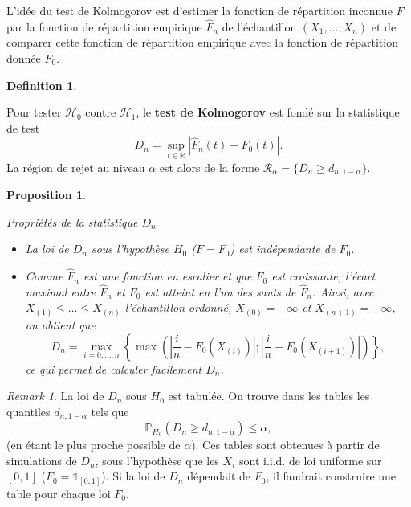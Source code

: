 \documentclass[
]{book}
\providecommand{\tightlist}{%
  \setlength{\itemsep}{0pt}\setlength{\parskip}{0pt}}
\newtheorem{proposition}{Proposition}[chapter]
\theoremstyle{definition}
\newtheorem{definition}{Definition}[chapter]
\theoremstyle{definition}
\theoremstyle{definition}
\theoremstyle{definition}
\theoremstyle{remark}
\newtheorem*{remark}{Remark}
\begin{document}
L'idée du test de Kolmogorov est d'estimer la fonction de répartition inconnue \(F\) par la fonction de répartition empirique \(\hat F_n\) de l'échantillon \((X_1,\ldots,X_n)\) et de comparer cette fonction de répartition empirique avec la fonction de répartition donnée \(F_0\).

\begin{definition}
\protect\hypertarget{def:unlabeled-div-18}{}\label{def:unlabeled-div-18}

Pour tester \(\mathcal{H}_0\) contre \(\mathcal{H}_1\), le \textbf{test de Kolmogorov} est fondé sur la statistique de test
\[D_n=\sup_{t \in \mathbb{R}} | \hat F_n(t)-F_0(t)|.\]
La région de rejet au niveau \(\alpha\) est alors de la forme \(\mathcal{R}_{\alpha}=\{D_n \geq d_{n,1-\alpha}\}\).

\end{definition}

\begin{proposition}
\protect\hypertarget{prp:unlabeled-div-19}{}\label{prp:unlabeled-div-19}

Propriétés de la statistique \(D_n\)

\begin{itemize}
\tightlist
\item
  La loi de \(D_n\) sous l'hypothèse \(H_0\) (\(F=F_0\)) est indépendante de \(F_0\).
\item
  Comme \(\hat F_n\) est une fonction en escalier et que \(F_0\) est croissante, l'écart maximal entre \(\hat F_n\) et \(F_0\) est atteint en l'un des sauts de \(\hat F_n\). Ainsi, avec
  \(X_{(1)}\leq \ldots \leq X_{(n)}\) l'échantillon ordonné, \(X_{(0)}=-\infty\) et \(X_{(n+1)}=+\infty\), on obtient que
  \[
    D_n=\max_{i=0,\ldots, n}\left\{\max \left( \left|\frac{i}{n}-F_0(X_{(i)})\right|; \left|\frac{i}{n}-F_0(X_{(i+1)})\right| \right)\right\},
  \]
  ce qui permet de calculer facilement \(D_n\).
\end{itemize}

\end{proposition}

\begin{remark}

La loi de \(D_n\) sous \(H_0\) est tabulée. On trouve dans les tables les quantiles \(d_{n,1-\alpha}\) tels que
\[\mathbb{P}_{H_0} (D_n  \geq d_{n,1-\alpha})\leq \alpha,\]
(en étant le plus proche possible de \(\alpha\)). Ces tables sont obtenues à partir de simulations de \(D_n\), sous l'hypothèse que les \(X_i\) sont i.i.d. de loi uniforme sur \([0,1]\) (\(F_0=\mathbb{1}_{[0,1]}\)). Si la loi de \(D_n\) dépendait de \(F_0\), il faudrait construire une table pour chaque loi \(F_0\).

\end{remark}
\end{document}
